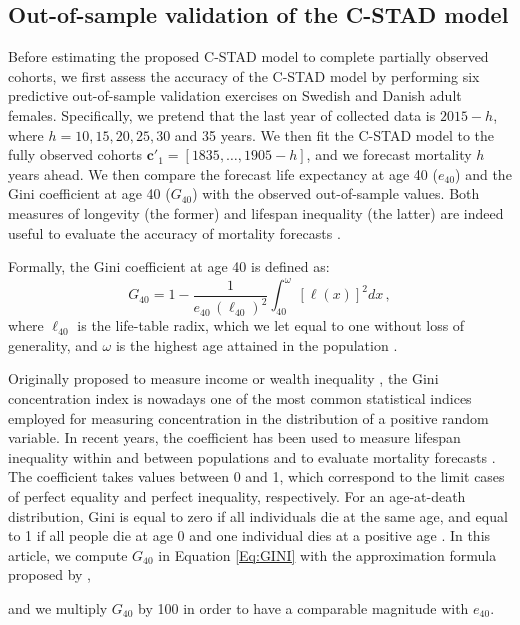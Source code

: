 \documentclass[11pt, a4paper]{article}
\begin{document}
\subsection{Out-of-sample validation of the C-STAD model}
\label{Subsec:Out-of-sample}
Before estimating the proposed C-STAD model to complete partially observed cohorts, we first assess the accuracy of the C-STAD model by performing six predictive out-of-sample validation exercises on Swedish and Danish adult females. Specifically, we pretend that the last year of collected data is $2015 - h$, where $h=10,15,20,25,30$ and 35 years. We then fit the C-STAD model to the fully observed cohorts {\color{red}$\bm{c}'_1=\left[1835,\dots,1905-h\right]$}, and we forecast mortality $h$ years ahead. We then compare the forecast life expectancy at age 40 ($e_{40}$) and the Gini coefficient at age 40 ($G_{40}$) with the observed out-of-sample values. Both measures of longevity (the former) and lifespan inequality (the latter) are indeed useful to evaluate the accuracy of mortality forecasts \citep{bohk2017lifespan}. {\color{red}Formally, the Gini coefficient at age 40 is defined as:
%
\begin{equation}\label{Eq:GINI}
G_{40} = 1 - \frac{1}{e_{40}\,\left(\ell_{40}\right)^2} \int_{40}^{\omega} \left[\ell(x)\right]^2 dx \, ,
\end{equation}
%
where $\ell_{40}$ is the life-table radix, which we let equal to one without loss of generality, and $\omega$ is the highest age attained in the population \citep{hanada1983formula,shkolnikov2003gini}.

Originally proposed to measure income or wealth inequality \citep{gini1912variabilita,gini1914sulla}, the Gini concentration index is nowadays one of the most common statistical indices employed for measuring concentration in the distribution of a positive random variable. In recent years, the coefficient has been used to measure lifespan inequality within and between populations \cite[see, e.g.,][]{shkolnikov2003gini,smits2009length,van2013perturbation,gigliarano2017longevity} and to evaluate mortality forecasts \citep{diaz2018mortality,basellini2019modelling}. The coefficient takes values between 0 and 1, which correspond to the limit cases of perfect equality and perfect inequality, respectively. For an age-at-death distribution, Gini is equal to zero if all individuals die at the same age, and equal to 1 if all people die at age 0 and one individual dies at a positive age \citep{shkolnikov2003gini}. In this article, we compute $G_{40}$ in Equation \eqref{Eq:GINI} with the approximation formula proposed by \cite{shkolnikov2003gini},} and we multiply $G_{40}$ by 100 in order to have a comparable magnitude with $e_{40}$.
\end{document}

